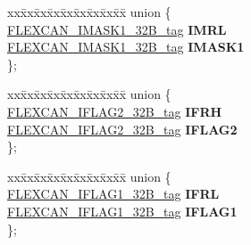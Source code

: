 \begin{DoxyCompactItemize}
\begin{tabbing}
\end{tabbing}\item 
\mbox{\label{structFLEXCAN__struct__tag_a05393ec26d93cf8cc55abaa10ef1e0ae}} 
\begin{tabbing}
xx\=xx\=xx\=xx\=xx\=xx\=xx\=xx\=xx\=\kill
union \{\\
\>\mbox{\hyperlink{unionFLEXCAN__IMASK1__32B__tag}{FLEXCAN\_IMASK1\_32B\_tag}} {\bfseries IMRL}\\
\>\mbox{\hyperlink{unionFLEXCAN__IMASK1__32B__tag}{FLEXCAN\_IMASK1\_32B\_tag}} {\bfseries IMASK1}\\
\}; \\

\end{tabbing}\item 
\mbox{\label{structFLEXCAN__struct__tag_a0b53d1de8b4b4a4bb70ac4b4b01fee90}} 
\begin{tabbing}
xx\=xx\=xx\=xx\=xx\=xx\=xx\=xx\=xx\=\kill
union \{\\
\>\mbox{\hyperlink{unionFLEXCAN__IFLAG2__32B__tag}{FLEXCAN\_IFLAG2\_32B\_tag}} {\bfseries IFRH}\\
\>\mbox{\hyperlink{unionFLEXCAN__IFLAG2__32B__tag}{FLEXCAN\_IFLAG2\_32B\_tag}} {\bfseries IFLAG2}\\
\}; \\

\end{tabbing}\item 
\mbox{\label{structFLEXCAN__struct__tag_a27e130e36ec47a4a704cc99bb7fdaf03}} 
\begin{tabbing}
xx\=xx\=xx\=xx\=xx\=xx\=xx\=xx\=xx\=\kill
union \{\\
\>\mbox{\hyperlink{unionFLEXCAN__IFLAG1__32B__tag}{FLEXCAN\_IFLAG1\_32B\_tag}} {\bfseries IFRL}\\
\>\mbox{\hyperlink{unionFLEXCAN__IFLAG1__32B__tag}{FLEXCAN\_IFLAG1\_32B\_tag}} {\bfseries IFLAG1}\\
\}; \\


\end{tabbing}
\end{DoxyCompactItemize}
